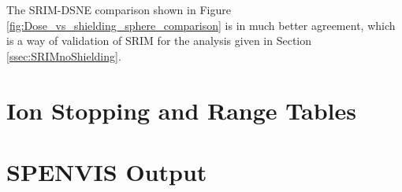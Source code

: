 \documentclass{hitec}
\begin{document}
The SRIM-DSNE comparison shown in Figure \ref{fig:Dose_vs_shielding_sphere_comparison} is in much better agreement, which is a way of validation of SRIM for the analysis given in Section \ref{ssec:SRIMnoShielding}.


\appendix
{}
\section{Ion Stopping and Range Tables}
\label{asec:IonStoppingRangeTables}










\section{SPENVIS Output}
\label{asec:SPENVISOutput}








\cleardoublepage
{}
{}


\end{document}
